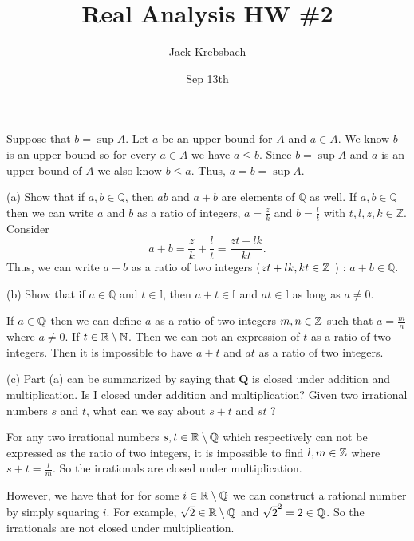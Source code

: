 \documentclass{report}
\title{Real Analysis HW \#2}
\author{Jack Krebsbach }
\date{Sep 13th}
\begin{document}
\maketitle


\begin{myproof}
Suppose that $b = \sup A$. Let $a$ be an upper bound for $A$ and $a \in A$. We know $b$ is an upper bound so for every $a \in A$ we have $a \leq b.$ Since $b = \sup A$ and $a$ is an upper bound of $A$ we also know $b \leq a$. Thus, $a = b = \sup A.$
\end{myproof}


(a) Show that if $a, b \in \mathbb{Q}$, then $a b$ and $a+b$ are elements of $\mathbb{Q}$ as well.
\sol If  $a, b \in \mathbb{Q}$ then we can write $a$ and $b$ as a ratio of integers, $a = \frac{z}{k}$ and $b= \frac{l}{t}$ with $t,l,z,k \in \mathbb{Z}.$ Consider $$
a+b = \frac{z}{k} + \frac{l}{t}= \frac{zt + lk}{kt}. 
$$
Thus, we can write $a+b$ as a ratio of two integers ($zt+lk,kt \in \ZZ$ ) : $a+b \in \mathbb{Q}$.
\par \bigskip

(b) Show that if $a \in \mathbb{Q}$ and $t \in \mathbb{I}$, then $a+t \in \mathbb{I}$ and $a t \in \mathbb{I}$ as long as $a \neq 0$.

\sol If $a \in \QQ$ then we can define $a$ as a ratio of two integers $m,n \in \ZZ$ such that $a = \frac{m}{n}$ where $a \neq 0$. If $t \in \RR \setminus \NN$. Then we can not an expression of $t$ as a ratio of two integers. Then it is impossible to have $a+t$ and $at$ as a ratio of two integers.  

\par \bigskip
(c) Part (a) can be summarized by saying that $\mathbf{Q}$ is closed under addition and multiplication. Is I closed under addition and multiplication? Given two irrational numbers $s$ and $t$, what can we say about $s+t$ and $s t$ ?
\smallskip
\par
\sol For any two irrational numbers $s,t \in \RR \setminus \QQ$ which respectively can not be expressed as the ratio of two integers, it is impossible to find $l,m \in \ZZ$ where $s+t = \frac{l}{m}$. So the irrationals are closed under multiplication.
\par
However, we have that for for some  $i \in \RR \setminus \QQ$ we can construct a rational number by simply squaring $i.$ For example, $\sqrt{2} \in \RR \setminus \QQ$ and $\sqrt{2}^2= 2 \in \QQ$. So the irrationals are not closed under multiplication.
\end{document}
